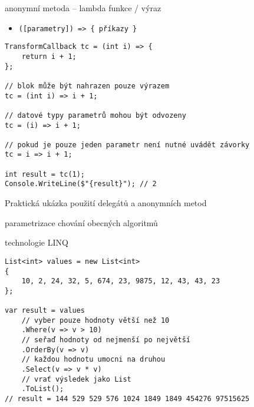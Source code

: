 \begin{frame}[fragile]
\begin{bitemize}{}
\item anonymní metoda -- lambda funkce / výraz
\begin{itemize}
\item \lstinline|([parametry]) => { příkazy }|
\end{itemize}
\end{bitemize}
\vfill
\begin{yesblock}
\begin{lstlisting}
TransformCallback tc = (int i) => {
    return i + 1;
};

// blok může být nahrazen pouze výrazem
tc = (int i) => i + 1;

// datové typy parametrů mohou být odvozeny
tc = (i) => i + 1;

// pokud je pouze jeden parametr není nutné uvádět závorky
tc = i => i + 1;

int result = tc(1);
Console.WriteLine($"{result}"); // 2
\end{lstlisting}
\end{yesblock}
\end{frame}







\begin{frame}[fragile]
\begin{bitemize}{Praktická ukázka použití delegátů a anonymních metod}
\item parametrizace chování obecných algoritmů
\item technologie LINQ
\end{bitemize}
\vfill
\begin{yesblock}
\begin{lstlisting}
List<int> values = new List<int>
{
    10, 2, 24, 32, 5, 674, 23, 9875, 12, 43, 43, 23
};

var result = values
    // vyber pouze hodnoty větší než 10
    .Where(v => v > 10)
    // seřaď hodnoty od nejmenší po největší
    .OrderBy(v => v)
    // každou hodnotu umocni na druhou
    .Select(v => v * v)
    // vrať výsledek jako List
    .ToList();
// result = 144 529 529 576 1024 1849 1849 454276 97515625
\end{lstlisting}
\end{yesblock}
\end{frame}



\nezkouskove

